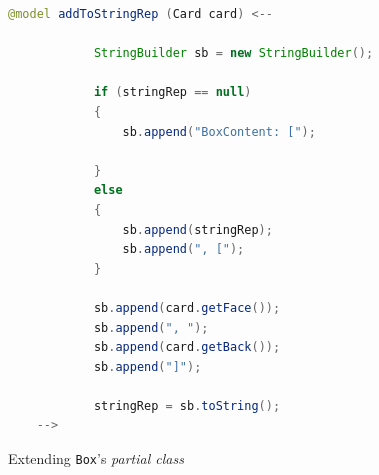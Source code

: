 \newpage

\vspace*{3cm}

\begin{figure}[h!]
        \centering
        \begin{lstlisting}[language=Java, keywordstyle={\bfseries\color{purple}}, backgroundcolor=\color{white}]
    @model addToStringRep (Card card) <--

            StringBuilder sb = new StringBuilder();

            if (stringRep == null)
            {
                sb.append("BoxContent: [");

            }
            else
            {
                sb.append(stringRep);
                sb.append(", [");
            }

            sb.append(card.getFace());
            sb.append(", ");
            sb.append(card.getBack());
            sb.append("]");

            stringRep = sb.toString();
    -->
        \end{lstlisting}
        \caption{Extending \texttt{Box}'s \emph{partial class}}
        \label{code:addToStringRep_inject_file}
    \end{figure}
    \FloatBarrier






